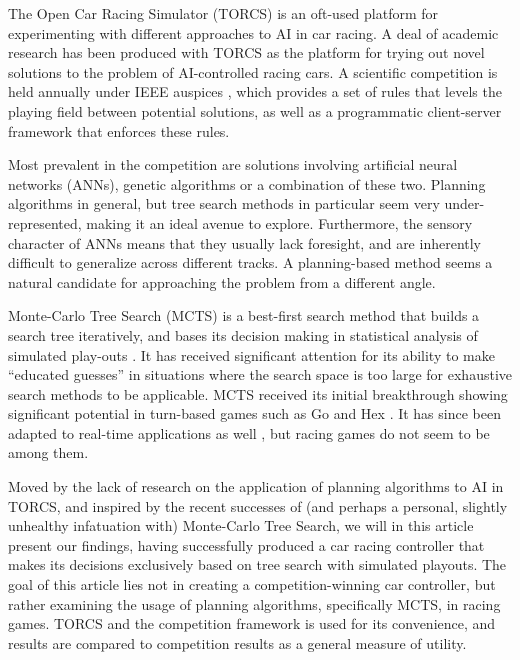\documentclass[conference]{IEEEtran}
\begin{document}
The Open Car Racing Simulator (TORCS) is an oft-used platform for experimenting with different approaches to AI in car racing. A deal of academic research has been produced \cite{optimalraceline}\cite{trackmodel}\cite{cobostar}\cite{fluff} with TORCS as the platform for trying out novel solutions to the problem of AI-controlled racing cars. A scientific competition is held annually under IEEE auspices \cite{2008championship}\cite{2009championship}, which provides a set of rules that levels the playing field between potential solutions, as well as a programmatic client-server framework that enforces these rules.

Most prevalent in the competition are solutions involving artificial neural networks (ANNs), genetic algorithms or a combination of these two. Planning algorithms in general, but tree search methods in particular seem very under-represented, making it an ideal avenue to explore. Furthermore, the sensory character of ANNs means that they usually lack foresight, and are inherently difficult to generalize across different tracks. A planning-based method seems a natural candidate for approaching the problem from a different angle.

Monte-Carlo Tree Search (MCTS) is a best-first search method that builds a search tree iteratively, and bases its decision making in statistical analysis of simulated play-outs \cite{browne}. It has received significant attention for its ability to make “educated guesses” in situations where the search space is too large for exhaustive search methods to be applicable. MCTS received its initial breakthrough showing significant potential in turn-based games such as Go \cite{go} and Hex \cite{hex}. It has since been adapted to real-time applications as well \cite{pacman}, but racing games do not seem to be among them.

Moved by the lack of research on the application of planning algorithms to AI in TORCS, and inspired by the recent successes of (and perhaps a personal, slightly unhealthy infatuation with) Monte-Carlo Tree Search, we will in this article present our findings, having successfully produced a car racing controller that makes its decisions exclusively based on tree search with simulated playouts. The goal of this article lies not in creating a competition-winning car controller, but rather examining the usage of planning algorithms, specifically MCTS, in racing games. TORCS and the competition framework is used for its convenience, and results are compared to competition results as a general measure of utility.
\end{document}

